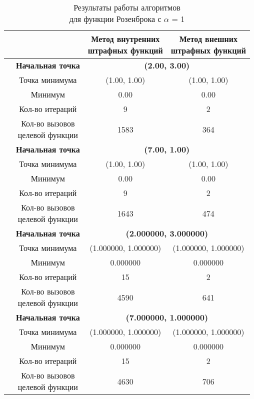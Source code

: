 \begin{table}[H]
        \centering
        \vspace*{-1.5em}
        \caption{Результаты работы алгоритмов\\для функции Розенброка с $\alpha$ = 1}
        \footnotesize
        \begin{tabular}{|c|c|c|c|}
        \hline
        & &\makecell{Метод внутренних\\штрафных функций} &\makecell{Метод внешних\\штрафных функций} \\
        \hline
	\multirow{8}{*}{\rotatebox[origin=c]{90}{$\varepsilon = 0.01$}}&\textbf{Начальная точка} &\multicolumn{2}{c|}{\textbf{(2.00, 3.00)}}\\
	\cline{2-4}
	&Точка минимума &(1.00, 1.00) &(1.00, 1.00) \\ 
	\cline{2-4}
	&Минимум &0.00 &0.00 \\ 
	\cline{2-4}
	&Кол-во итераций &9 &2 \\ 
	\cline{2-4}
	&\makecell{Кол-во вызовов\\целевой функции} &1583 &364 \\ 
	\cline{2-4}
\cline{2-4}&\textbf{Начальная точка} &\multicolumn{2}{c|}{\textbf{(7.00, 1.00)}}\\
	\cline{2-4}
	&Точка минимума &(1.00, 1.00) &(1.00, 1.00) \\ 
	\cline{2-4}
	&Минимум &0.00 &0.00 \\ 
	\cline{2-4}
	&Кол-во итераций &9 &2 \\ 
	\cline{2-4}
	&\makecell{Кол-во вызовов\\целевой функции} &1643 &474 \\ 
	\cline{2-4}
	\hline
	\multirow{8}{*}{\rotatebox[origin=c]{90}{$\varepsilon = 1e-06$}}&\textbf{Начальная точка} &\multicolumn{2}{c|}{\textbf{(2.000000, 3.000000)}}\\
	\cline{2-4}
	&Точка минимума &(1.000000, 1.000000) &(1.000000, 1.000000) \\ 
	\cline{2-4}
	&Минимум &0.000000 &0.000000 \\ 
	\cline{2-4}
	&Кол-во итераций &15 &2 \\ 
	\cline{2-4}
	&\makecell{Кол-во вызовов\\целевой функции} &4590 &641 \\ 
	\cline{2-4}
\cline{2-4}&\textbf{Начальная точка} &\multicolumn{2}{c|}{\textbf{(7.000000, 1.000000)}}\\
	\cline{2-4}
	&Точка минимума &(1.000000, 1.000000) &(1.000000, 1.000000) \\ 
	\cline{2-4}
	&Минимум &0.000000 &0.000000 \\ 
	\cline{2-4}
	&Кол-во итераций &15 &2 \\ 
	\cline{2-4}
	&\makecell{Кол-во вызовов\\целевой функции} &4630 &706 \\ 
	\cline{2-4}
	\hline

\end{tabular}
\end{table}


